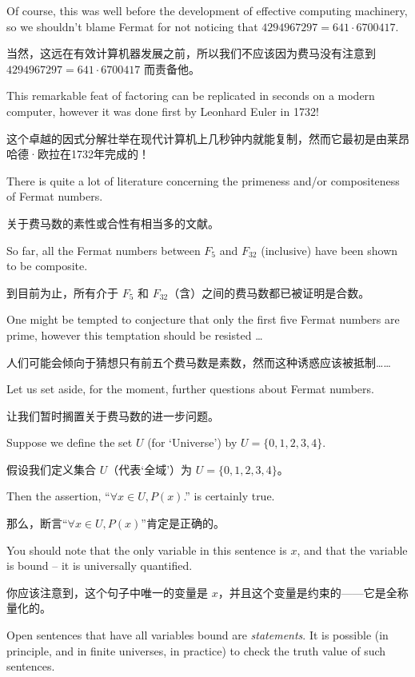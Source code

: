 Of course, this was well before the development of effective computing
machinery, so we shouldn't blame Fermat for not noticing that
$4294967297 = 641 \cdot 6700417$.

当然，这远在有效计算机器发展之前，所以我们不应该因为费马没有注意到 $4294967297 = 641 \cdot 6700417$ 而责备他。

This remarkable feat of factoring 
can be replicated in seconds on a modern computer, however it was done
first by  Leonhard Euler in 1732!

这个卓越的因式分解壮举在现代计算机上几秒钟内就能复制，然而它最初是由莱昂哈德·欧拉在1732年完成的！

There is quite a lot of literature 
concerning the primeness and/or compositeness of Fermat numbers.

关于费马数的素性或合性有相当多的文献。

So
far, all the Fermat numbers between $F_5$ and $F_{32}$ (inclusive) have
been shown to be composite.

到目前为止，所有介于 $F_5$ 和 $F_{32}$（含）之间的费马数都已被证明是合数。

One might be tempted to conjecture that
only the first five Fermat numbers are prime, however this temptation
should be resisted \ldots  

人们可能会倾向于猜想只有前五个费马数是素数，然而这种诱惑应该被抵制……

Let us set aside, for the moment, further questions about Fermat numbers.

让我们暂时搁置关于费马数的进一步问题。

Suppose we define the set $U$ (for `Universe') by $U=\{0,1,2,3,4\}$.

假设我们定义集合 $U$（代表‘全域’）为 $U=\{0,1,2,3,4\}$。

Then the assertion, ``$\forall x \in U, P(x)$.'' is certainly true.

那么，断言“$\forall x \in U, P(x)$”肯定是正确的。

You should note that the only variable in this sentence is $x$, and
that the variable is bound -- it is universally quantified.

你应该注意到，这个句子中唯一的变量是 $x$，并且这个变量是约束的——它是全称量化的。

Open sentences
that have all variables bound are {\em statements}.  It is possible 
(in principle, and in finite universes, in practice) to check the 
truth value of such sentences.

